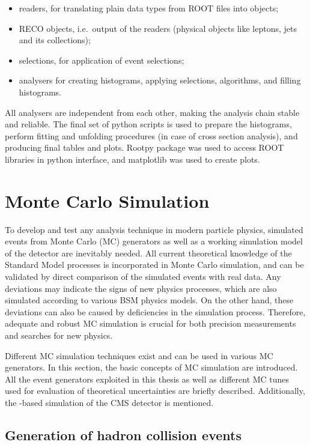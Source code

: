 \begin{itemize}
  \item readers, for translating plain data types from ROOT files into \Cplusplus objects;
  \item RECO objects, i.e.\ output of the readers (physical objects like leptons, jets and its collections);
  \item selections, for application of event selections;
  \item analysers for creating histograms, applying selections, algorithms, and filling histograms.
\end{itemize}

All analysers are independent from each other, making the analysis chain stable and reliable. The final set of python
scripts is used to prepare the histograms, perform fitting and unfolding procedures (in case of cross section analysis),
and producing final tables and plots. Rootpy package \autocite{rootpy} was used to access ROOT libraries in python
interface, and matplotlib \autocite{matplotlib} was used to create plots.

\newpage
\section{Monte Carlo Simulation}
\label{s:MC_simulation}
To develop and test any analysis technique in modern particle physics, simulated events from Monte Carlo (MC) generators
as well as a working simulation model of the detector are inevitably needed. All current theoretical knowledge of the
Standard Model processes is incorporated in Monte Carlo simulation, and can be validated by direct comparison of the
simulated events with real data. Any deviations may indicate the signs of new physics processes, which are also
simulated according to various BSM physics models. On the other hand, these deviations can also be caused by
deficiencies in the simulation process. Therefore, adequate and robust MC simulation is crucial for both precision
measurements and searches for new physics.

Different MC simulation techniques exist and can be used in various MC generators. In this section, the basic concepts
of MC simulation are introduced. All the event generators exploited in this thesis as well as different MC tunes used
for evaluation of theoretical uncertainties are briefly described. Additionally, the \GEANTfour-based
\autocite{GEANT4} simulation of the CMS detector is mentioned.

\subsection{Generation of hadron collision events}
\label{ss:hadron_collisions_simulation}

